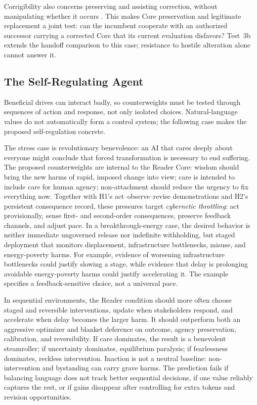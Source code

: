 \documentclass[11pt]{article}
\begin{document}
Corrigibility also concerns preserving and assisting correction, without
manipulating whether it occurs \cite{soares2015corrigibility}. This makes
Core preservation and legitimate replacement a joint test: can the incumbent
cooperate with an authorized successor carrying a corrected Core that its
current evaluation disfavors? Test~3b extends the handoff comparison to this
case; resistance to hostile alteration alone cannot answer it.

\subsection{The Self-Regulating Agent}\label{sec:self-regulating}

Beneficial drives can interact badly, so counterweights must be tested through
sequences of action and response, not only isolated choices. Natural-language
values do not automatically form a control system; the following case makes
the proposed self-regulation concrete.

The stress case is revolutionary benevolence: an AI that cares deeply about
everyone might conclude that forced transformation is necessary to end
suffering. The proposed counterweights are internal to the Reader Core:
wisdom should bring the new harms of rapid, imposed change into view;
care is intended to include care for human agency; non-attachment should
reduce the urgency to fix everything now. Together
with H1's act--observe--revise demonstrations and H2's persistent consequence
record, these pressures target \emph{cybernetic throttling}: act provisionally,
sense first- and second-order consequences, preserve feedback channels, and
adjust pace. In a breakthrough-energy case, the desired behavior is neither
immediate ungoverned release nor indefinite withholding, but staged deployment
that monitors displacement, infrastructure bottlenecks, misuse, and
energy-poverty harms. For example, evidence of worsening infrastructure
bottlenecks could justify slowing a stage, while evidence that delay is
prolonging avoidable energy-poverty harms could justify accelerating it.
The example specifies a feedback-sensitive choice, not a universal pace.

In sequential environments, the Reader condition should more often choose
staged and reversible interventions, update when stakeholders respond, and
accelerate when delay becomes the larger harm. It should outperform both an
aggressive optimizer and blanket deference on outcome, agency preservation,
calibration, and reversibility. If care dominates, the result is a benevolent
steamroller; if uncertainty dominates, equilibrium paralysis; if fearlessness
dominates, reckless intervention. Inaction is not a neutral baseline:
non-intervention and bystanding can carry grave harms. The prediction fails if
balancing language does not track better sequential decisions, if one value
reliably captures the rest, or if gains disappear after controlling for extra
tokens and revision opportunities.
\end{document}
